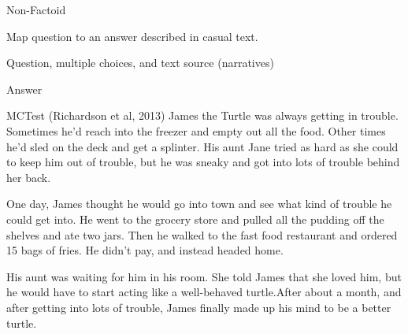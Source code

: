 \documentclass{beamer}
\begin{document}
  

\begin{frame}{Non-Factoid}
  \begin{description} \itemsep 20pt
  \item[Goal]Map question to an answer described in casual text.
  \item[Input] Question, multiple choices, and text source (narratives)
  \item[Output] Answer
  \end{description}  
\end{frame}

\begin{frame}{MCTest (Richardson et al, 2013)}
  James the Turtle was always getting in trouble. Sometimes he'd reach into the freezer and empty out all the food. Other times he'd sled on the deck and get a splinter. His aunt Jane tried as hard as she could to keep him out of trouble, but he was sneaky and got into lots of trouble behind her back.

  One day, James thought he would go into town and see what kind of trouble he could get into. He went to the grocery store and pulled all the pudding off the shelves and ate two jars. Then he walked to the fast food restaurant and ordered 15 bags of fries. He didn't pay, and instead headed home.

  His aunt was waiting for him in his room. She told James that she loved him, but he would have to start acting like a well-behaved turtle.After about a month, and after getting into lots of trouble, James finally made up his mind to be a better turtle.

\end{frame}
\end{document}

